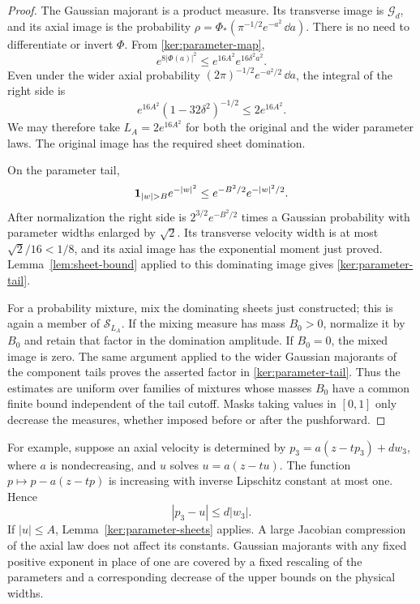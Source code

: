 \begin{proof}
The Gaussian majorant is a product measure. Its transverse image is
$\mathcal G_d$, and its axial image is the probability
$\rho=\Phi_*(\pi^{-1/2}e^{-a^2}\,\dd a)$. There is no need to
differentiate or invert $\Phi$. From \eqref{ker:parameter-map},
\[
 e^{8|\Phi(a)|^2}\leq e^{16A^2}e^{16\delta^2a^2}.
\]
Even under the wider axial probability
$(2\pi)^{-1/2}e^{-a^2/2}\,\dd a$, the integral of the right side
is
\[
 e^{16A^2}(1-32\delta^2)^{-1/2}\leq2e^{16A^2}.
\]
We may therefore take $L_A=2e^{16A^2}$ for both the original and
the wider parameter laws. The original image has the required
sheet domination.

On the parameter tail,
\[
 \ind_{|w|>B}e^{-|w|^2}
 \leq e^{-B^2/2}e^{-|w|^2/2}.
\]
After normalization the right side is $2^{3/2}e^{-B^2/2}$ times a
Gaussian probability with parameter widths enlarged by $\sqrt2$.
Its transverse velocity width is at most $\sqrt2/16<1/8$, and
its axial image has the exponential moment just proved.
Lemma~\ref{lem:sheet-bound} applied to this dominating image gives
\eqref{ker:parameter-tail}.

For a probability mixture, mix the dominating sheets just constructed;
this is again a member of $\mathcal S_{L_A}$. If the mixing measure
has mass $B_0>0$, normalize it by $B_0$ and retain that factor in
the domination amplitude. If $B_0=0$, the mixed image is zero.
The same argument applied to the wider Gaussian majorants of the
component tails proves the asserted factor in
\eqref{ker:parameter-tail}. Thus the estimates are uniform over
families of mixtures whose masses $B_0$ have a common finite bound
independent of the tail cutoff. Masks taking values in $[0,1]$ only
decrease the measures, whether imposed before or after the pushforward.
\end{proof}

For example, suppose an axial velocity is determined by
$p_3=a(z-tp_3)+d w_3$, where $a$ is nondecreasing, and $u$ solves
$u=a(z-tu)$. The function $p\mapsto p-a(z-tp)$ is increasing with
inverse Lipschitz constant at most one. Hence
\begin{equation}\label{ker:compressed-displacement}
 |p_3-u|\leq d|w_3|.
\end{equation}
If $|u|\leq A$, Lemma~\ref{ker:parameter-sheets} applies. A large
Jacobian compression of the axial law does not affect its constants.
Gaussian majorants with any fixed positive exponent in place of one
are covered by a fixed rescaling of the parameters and a corresponding
decrease of the upper bounds on the physical widths.

